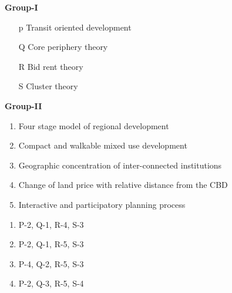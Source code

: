 \documentclass{article}
\begin{document}
 \begin{multicols}{2}
     
 
\hspace{1cm} \textbf{Group-I}
\begin{enumerate}[label=( \Alph*) ,leftmargin=1.5cm]
    \item[p] \hspace{0.2cm} Transit oriented development
    \item [Q] \hspace{0.2cm} Core periphery theory
    \item [R] \hspace{0.2cm} Bid rent theory
    \item [S] \hspace{0.2cm} Cluster theory
\end{enumerate}
\columnbreak
\noindent
\hspace{1cm} \textbf{Group-II}
\begin{enumerate}
    \item Four stage model of regional development
    \item Compact and walkable mixed use development
    \item Geographic concentration of inter-connected institutions
    \item Change of land price with relative distance from the CBD
    \item Interactive and participatory planning process
\end{enumerate}
\end{multicols}

\vspace{0.5cm}
\begin{multicols}{2}
    

\begin{enumerate}[label=(\Alph*),leftmargin=1.5cm]
    \item P-2, Q-1, R-4, S-3
    \item P-2, Q-1, R-5, S-3
    \item P-4, Q-2, R-5, S-3
    \item P-2, Q-3, R-5, S-4
\end{enumerate}
\end{multicols}
\vspace{0.5cm}
\end{document}
